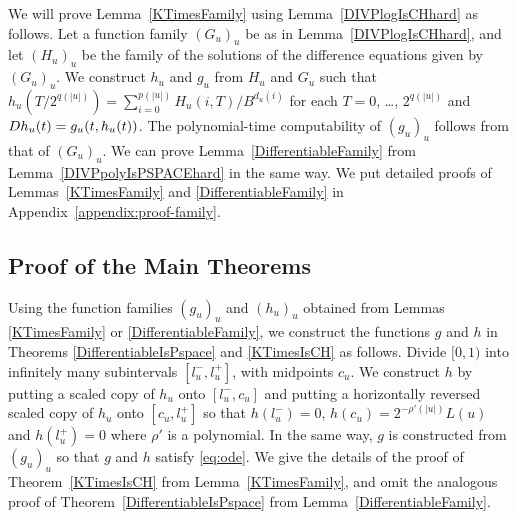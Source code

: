 We will prove Lemma~\ref{KTimesFamily} using Lemma~\ref{DIVPlogIsCHhard} as follows.
Let a function family $(G_u)_u$ be as in Lemma~\ref{DIVPlogIsCHhard},
and let $(H_u)_u$ be the family of the solutions of the difference equations given by $(G_u)_u$.
We construct $h_u$ and $g_u$ from $H_u$ and $G_u$ 
such that $h_u(T/2^{q(|u|)}) = \sum^{p(|u|)}_{i = 0} H_u(i, T)/B^{d_u(i)}$ for each $T = 0$, \ldots, $2^{q(|u|)}$
and $D h_u(t) = g_u(t, h_u(t))$.
The polynomial-time computability of $(g_u)_u$ follows from that of $(G_u)_u$.
We can prove Lemma~\ref{DifferentiableFamily} from Lemma~\ref{DIVPpolyIsPSPACEhard} in the same way.
We put detailed proofs of Lemmas~\ref{KTimesFamily} and \ref{DifferentiableFamily}
in Appendix~\ref{appendix:proof-family}.


\subsection{Proof of the Main Theorems}
\label{subsection: proof of theorems}
Using the function families $(g_u)_u$ and $(h_u)_u$ 
obtained from Lemmas \ref{KTimesFamily} or \ref{DifferentiableFamily}, 
we construct the functions $g$ and $h$ in 
Theorems \ref{DifferentiableIsPspace} and \ref{KTimesIsCH} as follows. 
Divide $[0,1)$ into infinitely many subintervals $[l^-_u, l^+_u]$,
with midpoints $c_u$.
We construct $h$ by putting a scaled copy of $h_u$ onto $[l^-_u, c_u]$ and
putting a horizontally reversed scaled copy of $h_u$ onto $[c_u, l^+_u]$ 
so that $h(l^-_u) = 0$, $h(c_u) = 2^{-\rho'(|u|)} L(u)$ and $h(l^+_u) = 0$ where $\rho'$ is a polynomial.
In the same way, $g$ is constructed from $(g_u)_u$ so that $g$ and $h$ satisfy \eqref{eq:ode}.
We give the details of the proof of 
Theorem~\ref{KTimesIsCH} from Lemma~\ref{KTimesFamily}, 
and omit the analogous proof of Theorem~\ref{DifferentiableIsPspace} 
from Lemma~\ref{DifferentiableFamily}. 


